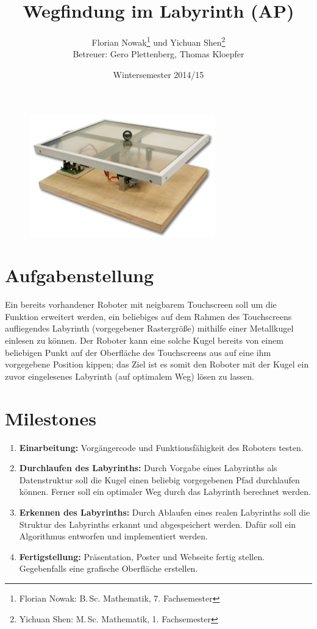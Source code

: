 \documentclass[ngerman]{scrartcl}
\title{Wegfindung im Labyrinth (AP)}
\author{
    Florian Nowak\footnote{Florian Nowak: B.\,Sc. Mathematik, 7. Fachsemester}\; und Yichuan Shen\footnote{Yichuan Shen: M.\,Sc. Mathematik, 1. Fachsemester}\\
    Betreuer: Gero Plettenberg, Thomas Kloepfer
}
\date{Wintersemester 2014/15}
\begin{document}

\maketitle

\begin{figure}[h]
    \centering
    \includegraphics[scale=.5]{platzhalter}
\end{figure}

\section*{Aufgabenstellung}

Ein bereits vorhandener Roboter mit neigbarem Touchscreen soll um die Funktion erweitert werden, ein beliebiges auf dem Rahmen des Touchscreens aufliegendes Labyrinth (vorgegebener Rastergröße) mithilfe einer Metallkugel einlesen zu können. Der Roboter kann eine solche Kugel bereits von einem beliebigen Punkt auf der Oberfläche des Touchscreens aus auf eine ihm vorgegebene Position kippen; das Ziel ist es somit den Roboter mit der Kugel ein zuvor eingelesenes Labyrinth (auf optimalem Weg) lösen zu lassen.

\section*{Milestones}
\begin{enumerate}
    \item \textbf{Einarbeitung:} Vorgängercode und Funktionsfähigkeit des Roboters testen.
    \item \textbf{Durchlaufen des Labyrinths:} Durch Vorgabe eines Labyrinths als Datenstruktur soll die Kugel einen beliebig vorgegebenen Pfad durchlaufen können. Ferner soll ein optimaler Weg durch das Labyrinth berechnet werden.
    \item \textbf{Erkennen des Labyrinths:} Durch Ablaufen eines realen Labyrinths soll die Struktur des Labyrinths erkannt und abgespeichert werden. Dafür soll ein Algorithmus entworfen und implementiert werden.
    \item \textbf{Fertigstellung:} Präsentation, Poster und Webseite fertig stellen. Gegebenfalls eine grafische Oberfläche erstellen.
\end{enumerate}
\end{document}

